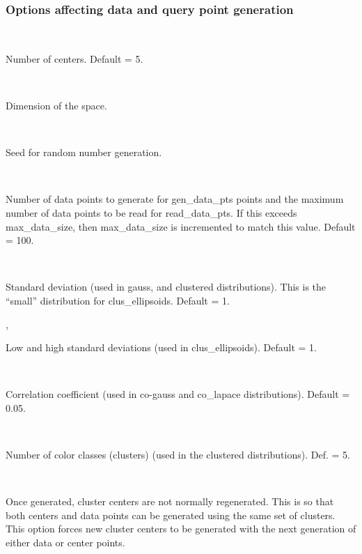 \documentclass[11pt]{article}		%
\newenvironment{description*}%
  {\begin{description}%
    \setlength{\itemsep}{-0.5ex}%
    \setlength{\parsep}{0pt}}%
  {\end{description}}
\begin{document}
\subsubsection{Options affecting data and query point generation}

\begin{description*}
\item[\SF{kcenters \BR{int}}] ~

  	Number of centers.  Default = 5.

\item[\SF{dim \BR{int}}] ~

  	Dimension of the space.

\item[\SF{seed \BR{int}}] ~

  	Seed for random number generation.

\item[\SF{data\_size \BR{int}}] ~

	Number of data points to generate for gen\_data\_pts points and
	the maximum number of data points to be read for read\_data\_pts.
	If this exceeds max\_data\_size, then max\_data\_size is incremented
	to match this value.  Default = 100.

\item[\SF{std\_dev \BR{float}}] ~

	Standard deviation (used in gauss, and clustered distributions).
	This is the ``small'' distribution for clus\_ellipsoids.  Default
	= 1.

\item[\SF{std\_dev\_lo \BR{float}}, \SF{std\_dev\_hi \BR{float}}] ~

  	Low and high standard deviations (used in clus\_ellipsoids).
	Default = 1.

\item[\SF{corr\_coef \BR{float}}] ~

  	Correlation coefficient (used in co-gauss and co\_lapace
	distributions). Default = 0.05.

\item[\SF{colors \BR{int}}] ~

	Number of color classes (clusters) (used in the clustered
	distributions).  Def. = 5.

\item[\SF{new\_clust}] ~

	Once generated, cluster centers are not normally regenerated.
	This is so that both centers and data points can be generated
	using the same set of clusters.  This option forces new cluster
	centers to be generated with the next generation of either data
	or center points.


\end{description*}
\end{document}
